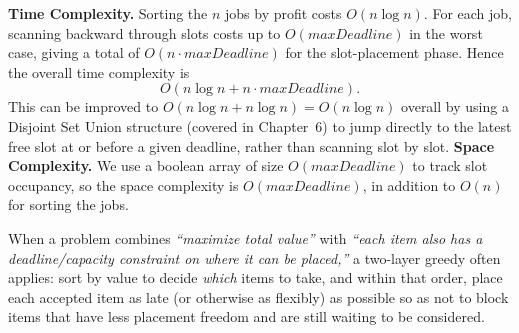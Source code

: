 \begin{complexitybox}
\textbf{Time Complexity.} Sorting the $n$ jobs by profit costs
$O(n \log n)$. For each job, scanning backward through slots costs up to
$O(\textit{maxDeadline})$ in the worst case, giving a total of
$O(n \cdot \textit{maxDeadline})$ for the slot-placement phase. Hence the
overall time complexity is
\[
  O(n \log n + n \cdot \textit{maxDeadline}).
\]
This can be improved to $O(n \log n + n \log n) = O(n \log n)$ overall by
using a Disjoint Set Union structure (covered in Chapter~6) to jump directly
to the latest free slot at or before a given deadline, rather than scanning
slot by slot.
\textbf{Space Complexity.} We use a boolean array of size
$O(\textit{maxDeadline})$ to track slot occupancy, so the space complexity
is $O(\textit{maxDeadline})$, in addition to $O(n)$ for sorting the jobs.
\end{complexitybox}

\begin{takeawaybox}
When a problem combines \emph{``maximize total value''} with
\emph{``each item also has a deadline/capacity constraint on where it can
be placed,''} a two-layer greedy often applies: sort by value to decide
\emph{which} items to take, and within that order, place each accepted item
as late (or otherwise as flexibly) as possible so as not to block items that
have less placement freedom and are still waiting to be considered.
\end{takeawaybox}
